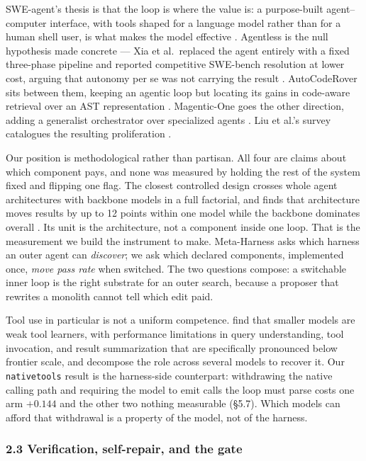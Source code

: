 \documentclass[
  10pt,
  a4paper,
]{article}
\newcounter{none} %
\let\oldtexttt\texttt
\renewcommand{\texttt}[1]{{\small\oldtexttt{#1}}}
\begin{document}
SWE-agent's thesis is that the loop is where the value is: a
purpose-built agent--computer interface, with tools shaped for a
language model rather than for a human shell user, is what makes the
model effective \citep{yang2024sweagent}. Agentless is the null
hypothesis made concrete --- Xia et al.~replaced the agent entirely with
a fixed three-phase pipeline and reported competitive SWE-bench
resolution at lower cost, arguing that autonomy per se was not carrying
the result \citep{xia2024agentless, xia2025demystifying}. AutoCodeRover
sits between them, keeping an agentic loop but locating its gains in
code-aware retrieval over an AST representation
\citep{zhang2024autocoderover}. Magentic-One goes the other direction,
adding a generalist orchestrator over specialized agents
\citep{fourney2024magenticone}. Liu et al.'s survey catalogues the
resulting proliferation \citep{liu2024survey}.

Our position is methodological rather than partisan. All four are claims
about which component pays, and none was measured by holding the rest of
the system fixed and flipping one flag. The closest controlled design
crosses whole agent architectures with backbone models in a full
factorial, and finds that architecture moves results by up to 12 points
within one model while the backbone dominates overall
\citep{bandel2026general}. Its unit is the architecture, not a component
inside one loop. That is the measurement we build the instrument to
make. Meta-Harness asks which harness an outer agent can
\emph{discover}; we ask which declared components, implemented once,
\emph{move pass rate} when switched. The two questions compose: a
switchable inner loop is the right substrate for an outer search,
because a proposer that rewrites a monolith cannot tell which edit paid.

Tool use in particular is not a uniform competence.
\citet{shen2024smallllms} find that smaller models are weak tool
learners, with performance limitations in query understanding, tool
invocation, and result summarization that are specifically pronounced
below frontier scale, and decompose the role across several models to
recover it. Our \texttt{nativetools} result is the harness-side
counterpart: withdrawing the native calling path and requiring the model
to emit calls the loop must parse costs one arm \(+0.144\) and the other
two nothing measurable (§5.7). Which models can afford that withdrawal
is a property of the model, not of the harness.

\subsubsection{2.3 Verification, self-repair, and the
gate}\label{verification-self-repair-and-the-gate}
\end{document}

